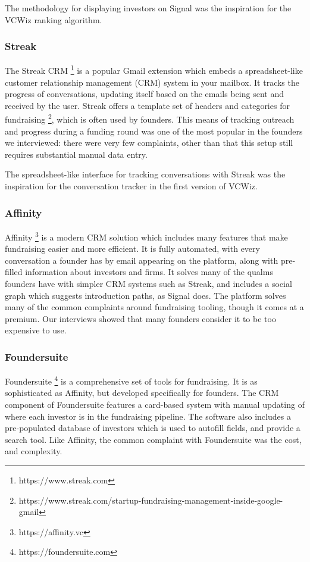 The methodology for displaying investors on Signal \cite{signal-methodolody} was the inspiration for the VCWiz ranking algorithm.

\subsubsection{Streak}

The Streak CRM \footnote{https://www.streak.com} is a popular Gmail extension which embeds a spreadsheet-like customer relationship management (CRM) system in your mailbox. It tracks the progress of conversations, updating itself based on the emails being sent and received by the user. Streak offers a template set of headers and categories for fundraising \footnote{https://www.streak.com/startup-fundraising-management-inside-google-gmail}, which is often used by founders. This means of tracking outreach and progress during a funding round was one of the most popular in the founders we interviewed: there were very few complaints, other than that this setup still requires substantial manual data entry.

The spreadsheet-like interface for tracking conversations with Streak was the inspiration for the conversation tracker in the first version of VCWiz.

\subsubsection{Affinity}

Affinity \footnote{https://affinity.vc} is a modern CRM solution which includes many features that make fundraising easier and more efficient. It is fully automated, with every conversation a founder has by email appearing on the platform, along with pre-filled information about investors and firms. It solves many of the qualms founders have with simpler CRM systems such as Streak, and includes a social graph which suggests introduction paths, as Signal does. The platform solves many of the common complaints around fundraising tooling, though it comes at a premium. Our interviews showed that many founders consider it to be too expensive to use.

\subsubsection{Foundersuite}

Foundersuite \footnote{https://foundersuite.com} is a comprehensive set of tools for fundraising. It is as sophisticated as Affinity, but developed specifically for founders. The CRM component of Foundersuite features a card-based system with manual updating of where each investor is in the fundraising pipeline. The software also includes a pre-populated database of investors which is used to autofill fields, and provide a search tool. Like Affinity, the common complaint with Foundersuite was the cost, and complexity.

